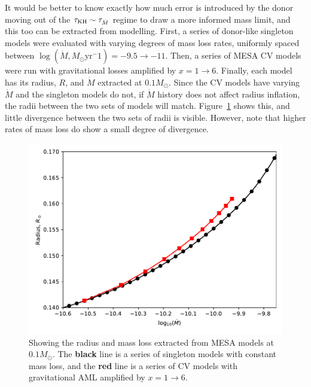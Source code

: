 It would be better to know exactly how much error is introduced by the donor moving out of the $\tau_{\rm KH} \sim \tau_{\dot M}$ regime to draw a more informed mass limit, and this too can be extracted from modelling.
First, a series of donor-like singleton models were evaluated with varying degrees of mass loss rates, uniformly spaced between $\log (\dot M, M_\odot \mathrm{yr}^-1) = -9.5 \rightarrow -11$.
Then, a series of MESA CV models were run with gravitational losses amplified by $x = 1 \rightarrow 6$.
Finally, each model has its radius, $R$, and $\dot M$ extracted at $0.1 M_\odot$. Since the CV models have varying $\dot M$ and the singleton models do not, if $\dot M$ history does not affect radius inflation, the radii between the two sets of models will match. Figure~\ref{fig:modelling:comparing radii at 0.1Msun} shows this, and little divergence between the two sets of radii is visible. However, note that higher rates of mass loss do show a small degree of divergence.
\begin{figure}
    \centering
    \includegraphics[width=.8\textwidth]{figures/modelling/compare_0.1Msun_with_CV_track_K11_fig1.pdf}
    \caption{Showing the radius and mass loss extracted from MESA models at $0.1 M_\odot$. The {\bf black} line is a series of singleton models with constant mass loss, and the {\bf red} line is a series of CV models with gravitational AML amplified by $x = 1 \rightarrow 6$.}
    \label{fig:modelling:comparing radii at 0.1Msun}
\end{figure}

